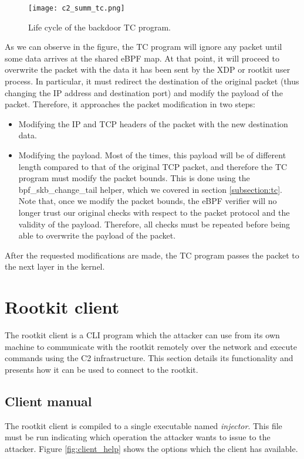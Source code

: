 \begin{figure}[htbp]
	\centering
	\texttt{[image: c2\_summ\_tc.png]}
	\caption{Life cycle of the backdoor TC program.}
	\label{fig:c2_summ_tc}
\end{figure}

As we can observe in the figure, the TC program will ignore any packet until some data arrives at the shared eBPF map. At that point, it will proceed to overwrite the packet with the data it has been sent by the XDP or rootkit user process. In particular, it must redirect the destination of the original packet (thus changing the IP address and destination port) and modify the payload of the packet. Therefore, it approaches the packet modification in two steps:
\begin{itemize}
\item Modifying the IP and TCP headers of the packet with the new destination data.
\item Modifying the payload. Most of the times, this payload will be of different length compared to that of the original TCP packet, and therefore the TC program must modify the packet bounds. This is done using the bpf\_skb\_change\_tail helper, which we covered in section \ref{subsection:tc}. Note that, once we modify the packet bounds, the eBPF verifier will no longer trust our original checks with respect to the packet protocol and the validity of the payload. Therefore, all checks must be repeated before being able to overwrite the payload of the packet.
\end{itemize}

After the requested modifications are made, the TC program passes the packet to the next layer in the kernel.



\section{Rootkit client}
The rootkit client is a CLI program which the attacker can use from its own machine to communicate with the rootkit remotely over the network and execute commands using the C2 infrastructure. This section details its functionality and presents how it can be used to connect to the rootkit.

\subsection{Client manual} \label{subsection:rootkit_manual}
The rootkit client is compiled to a single executable named \textit{injector}. This file must be run indicating which operation the attacker wants to issue to the attacker. Figure \ref{fig:client_help} shows the options which the client has available.

